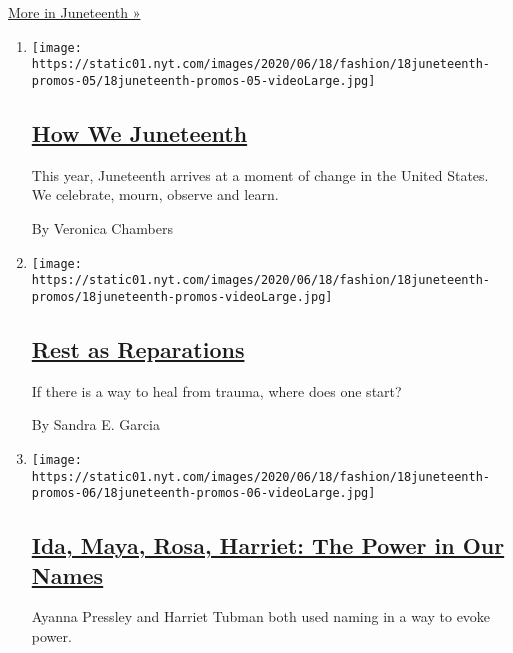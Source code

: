 \href{/issue/style/2020/06/18/juneteenth}{More in Juneteenth »}

\begin{enumerate}
\def\labelenumi{\arabic{enumi}.}
\item
  \texttt{[image: https://static01.nyt.com/images/2020/06/18/fashion/18juneteenth-promos-05/18juneteenth-promos-05-videoLarge.jpg]}

  \hypertarget{how-we-juneteenth}{%
  \subsection{\texorpdfstring{\href{/interactive/2020/06/18/style/juneteenth-celebration.html}{How
  We Juneteenth}}{How We Juneteenth}}\label{how-we-juneteenth}}

  This year, Juneteenth arrives at a moment of change in the United
  States. We celebrate, mourn, observe and learn.

  By Veronica Chambers
\item
  \texttt{[image: https://static01.nyt.com/images/2020/06/18/fashion/18juneteenth-promos/18juneteenth-promos-videoLarge.jpg]}

  \hypertarget{rest-as-reparations}{%
  \subsection{\texorpdfstring{\href{/2020/06/18/style/self-care/healing-trauma-racism-wellness.html}{Rest
  as Reparations}}{Rest as Reparations}}\label{rest-as-reparations}}

  If there is a way to heal from trauma, where does one start?

  By Sandra E. Garcia
\item
  \texttt{[image: https://static01.nyt.com/images/2020/06/18/fashion/18juneteenth-promos-06/18juneteenth-promos-06-videoLarge.jpg]}

  \hypertarget{ida-maya-rosa-harriet-the-power-in-our-names}{%
  \subsection{\texorpdfstring{\href{/2020/06/18/style/self-care/sojourner-truth-harriet-tubman-slavery-names.html}{Ida,
  Maya, Rosa, Harriet: The Power in Our
  Names}}{Ida, Maya, Rosa, Harriet: The Power in Our Names}}\label{ida-maya-rosa-harriet-the-power-in-our-names}}

  Ayanna Pressley and Harriet Tubman both used naming in a way to evoke
  power.


\end{enumerate}
